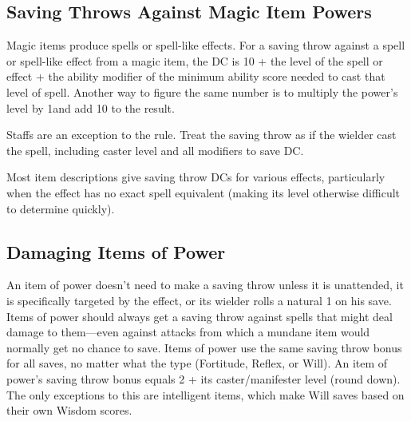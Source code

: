 





\subsection{Saving Throws Against Magic Item Powers}
Magic items produce spells or spell-like effects. For a saving throw against a spell or spell-like effect from a magic item, the DC is 10 + the level of the spell or effect + the ability modifier of the minimum ability score needed to cast that level of spell. Another way to figure the same number is to multiply the power's level by 1\onehalf and add 10 to the result.

Staffs are an exception to the rule. Treat the saving throw as if the wielder cast the spell, including caster level and all modifiers to save DC.

Most item descriptions give saving throw DCs for various effects, particularly when the effect has no exact spell equivalent (making its level otherwise difficult to determine quickly).

\subsection{Damaging Items of Power}
An item of power doesn't need to make a saving throw unless it is unattended, it is specifically targeted by the effect, or its wielder rolls a natural 1 on his save. Items of power should always get a saving throw against spells that might deal damage to them---even against attacks from which a mundane item would normally get no chance to save. Items of power use the same saving throw bonus for all saves, no matter what the type (Fortitude, Reflex, or Will). An item of power's saving throw bonus equals 2 + \onehalf its caster/manifester level (round down). The only exceptions to this are intelligent items, which make Will saves based on their own Wisdom scores.

